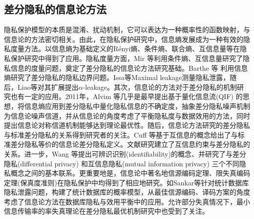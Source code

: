 \subsection{差分隐私的信息论方法}\label{subsec:information_dp}
隐私保护模型的本质是混淆、扰动机制，它可以表达为一种概率性的函数映射，与信息论的方法密切相关\cite{Duchi2019information}。由此，在隐私保护研究中，信息熵发展成为一种有效的隐私度量方法\cite{issa2016an,Chatzikokolakis2008Anonymity}。以信息熵为基础定义的R\'{e}nyi熵\cite{renyi1961on,erven2014renyi,mironov2017renyi}、条件熵、联合熵、互信息量等在隐私保护研究中得到了应用\cite{wang2019consistent,mcgregor2010the,du2015Fundamental,lopuhaa-zwakenberg2019information}。隐私度量方面，Mir 等\cite{mir2012information}利用条件熵、互信息量研究了隐私信息的度量问题，奠定了差分隐私的信息论方法研究基础。Barthe 等\cite{barthe2011information} 利用信息熵研究了差分隐私的隐私边界问题。Issa等\cite{issa2016an,2016Maximal}Maximal leakage测量隐私泄露，随后，Liao等\cite{liao2019tunable}对其扩展提出$\alpha$-leakage。其次，信息论的方法对于差分隐私的机制研究也有一定的应用\cite{diaz2020on,kairouz2016extremal,wang2016on}。2011年，Alvim 等\cite{alvim2011differential,alvim2011on,alvim2015on}几乎是最早提出基于量化信息流(QIF) 的思想，将信息熵应用到差分隐私中量化隐私信息的不确定度，抽象差分隐私噪声机制为信息论噪声信道，并从信息论的角度考虑了平衡隐私度与数据效用的方法，同时提出信息论对称信道机制能够达到理论最优性。随后，信息论方法研究的差分隐私与标准差分隐私的关系得到研究者的关注\cite{mcgregor2010the}。Cuff 等\cite{cuff2016differential}基于互信息的概念给出了与标准差分隐私等价的信息论差分隐私定义。文献\cite{calmon2012privacy,makhdoumi2013privacy}研究建立了互信息约束与差分隐私的关系。进一步，Wang 等\cite{wang2016on}提出可辨识识别(identifiability)的概念、并研究了与差分隐私(differential privacy) 和互信息隐私(mutual information privacy) 三个不同隐私概念之间的基本联系。更重要地是，信息论中著名地信源编码定理、限失真编码定理(保真度准则)\cite{cover2006elements}在隐私保护中均得到了相应地研究\cite{rebollo-monedero2010from,du2015Fundamental}。如Sankar等\cite{sankar2013utility}针对统计数据库隐私泄露问题，构建了统计数据库的概率模型，从最佳信源编码、译码方案的角度考虑了信息论方法在数据库隐私与效用平衡中的应用。允许部分失真情况下，最小信息传输率的率失真理论在差分隐私\cite{mir2012information,wang2016on}最优机制研究中也受到了关注。

